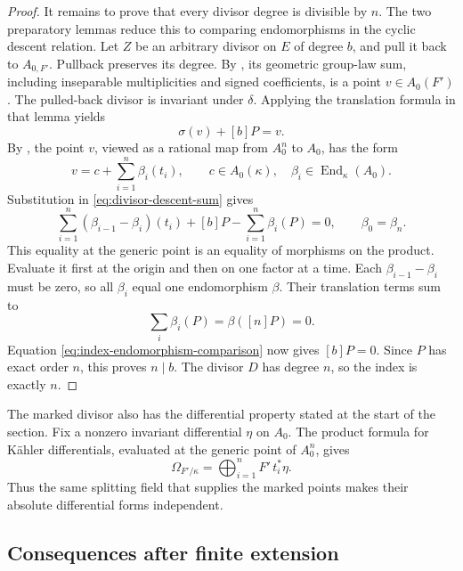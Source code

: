 \begin{proof}
It remains to prove that every divisor degree is divisible by $n$.
The two preparatory lemmas reduce this to comparing endomorphisms in
the cyclic descent relation.
Let $Z$ be an arbitrary divisor on $E$ of degree $b$, and pull it
back to $A_{0,F'}$.  Pullback preserves its degree.  By
, its geometric group-law sum,
including inseparable multiplicities and signed coefficients, is a
point $v\in A_0(F')$.  The pulled-back divisor is invariant under
$\delta$.  Applying the translation formula in that lemma yields
\begin{equation}\label{eq:divisor-descent-sum}
                               \sigma(v)+[b]P=v.
\end{equation}
By , the point $v$, viewed as a
rational map from $A_0^n$ to $A_0$, has the form
\[
                  v=c+\sum_{i=1}^n\beta_i(t_i),\qquad
                  c\in A_0(\kappa),\quad
                  \beta_i\in\operatorname{End}_\kappa(A_0).
\]
Substitution in \eqref{eq:divisor-descent-sum} gives
\begin{equation}\label{eq:index-endomorphism-comparison}
 \sum_{i=1}^n(\beta_{i-1}-\beta_i)(t_i)
           +[b]P-\sum_{i=1}^n\beta_i(P)=0,
 \qquad \beta_0=\beta_n.
\end{equation}
This equality at the generic point is an equality of morphisms on
the product.  Evaluate it first at the origin and then on one factor
at a time.  Each $\beta_{i-1}-\beta_i$ must be zero, so all
$\beta_i$ equal one endomorphism $\beta$.  Their translation terms
sum to
\[
                         \sum_i\beta_i(P)=\beta([n]P)=0.
\]
Equation \eqref{eq:index-endomorphism-comparison} now gives
$[b]P=0$.  Since $P$ has exact order $n$, this proves $n\mid b$.
The divisor $D$ has degree $n$, so the index is exactly $n$.
\end{proof}

The marked divisor also has the differential property stated at the
start of the section. Fix a nonzero invariant differential $\eta$ on
$A_0$. The product formula for K\"ahler differentials, evaluated at the
generic point of $A_0^n$, gives
\begin{equation}\label{eq:label-differential-basis}
 \Omega_{F'/\kappa}=\bigoplus_{i=1}^n F'\,t_i^*\eta.
\end{equation}
Thus the same splitting field that supplies the marked points makes
their absolute differential forms independent.

\subsection{Consequences after finite extension}

